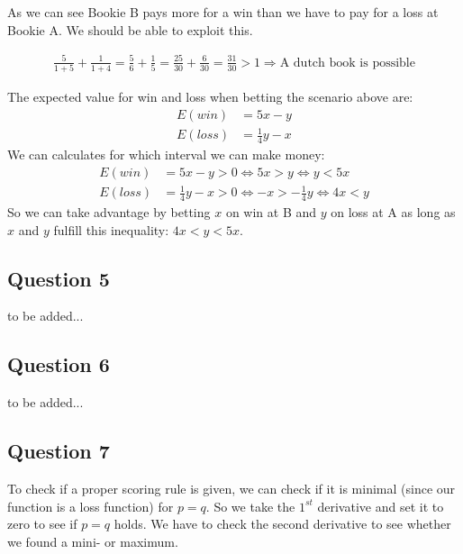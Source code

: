 \documentclass[../main/Notes.tex]{subfiles}
\begin{document}
As we can see Bookie B pays more for a win than we have to pay for a loss at Bookie A. We should be able to exploit this.

\begin{align*}
\frac{5}{1+5}+\frac{1}{1+4} = \frac{5}{6} + \frac{1}{5} = \frac{25}{30} + \frac{6}{30} = \frac{31}{30} > 1 \Rightarrow \text{A dutch book is possible}
\end{align*}

The expected value for win and loss when betting the scenario above are:
\begin{align*}
E(win)  &= 5x-y \\
E(loss) &= \frac{1}{4}y-x
\end{align*}
We can calculates for which interval we can make money:
\begin{align*}
E(win)  &= 5x-y           > 0 \Leftrightarrow 5x>y             \Leftrightarrow y < 5x \\
E(loss) &= \frac{1}{4}y-x > 0 \Leftrightarrow -x>-\frac{1}{4}y \Leftrightarrow 4x < y
\end{align*}
So we can take advantage by betting $x$ on win at B and $y$ on loss at A as long as $x$ and $y$ fulfill this inequality: $4x<y<5x$.



\subsection*{Question 5}
to be added...



\subsection*{Question 6}
to be added...



\subsection*{Question 7}
To check if a proper scoring rule is given, we can check if it is minimal (since our function is a loss function) for $p=q$. So we take the $1^{st}$ derivative and set it to zero to see if $p=q$ holds. We have to check the second derivative to see whether we found a mini- or maximum.
\end{document}
